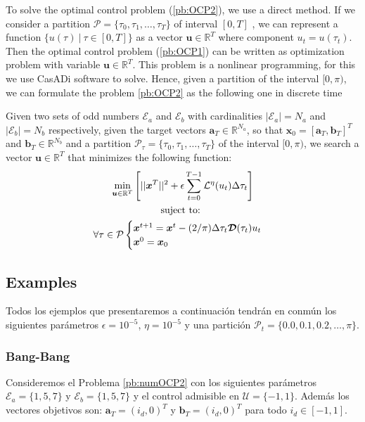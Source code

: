 To solve the optimal control problem (\ref{pb:OCP2}), we use a direct method. 
%
If we consider a partition $\mathcal{P} = \{\tau_0,\tau_1,\dots,\tau_{T}\}$ of interval $[0,T]$ , we can represent a function $\{ u(\tau) \ | \ \tau \in [0,T]\}$ as a vector $\bm{u} \in \mathbb{R}^{T}$ where component $u_t = u(\tau_t)$. 
%
Then the optimal control problem (\ref{pb:OCP1}) can be written as optimization problem with variable $\bm{u} \in \mathbb{R}^{T}$. This problem is a nonlinear programming, for this we use CasADi software to solve. 
%
Hence, given a partition of the interval $[0,\pi)$, we can formulate the problem \ref{pb:OCP2} as the following one in discrete time
\newline

\begin{problem}\label{pb:numOCP2}
Given two sets of odd numbers $\mathcal{E}_a$ and $\mathcal{E}_b$ with cardinalities $|\mathcal{E}_a| = N_a$ and $|\mathcal{E}_b| = N_b$ respectively, given the target vectors $\bm{a}_T  \in \mathbb{R}^{N_a}$, so that $\bm{x}_0 = [\bm{a}_T,\bm{b}_T]^T$ and $\bm{b}_T \in \mathbb{R}^{N_b}$ and a partition $\mathcal{P}_\tau = \{\tau_0,\tau_1,\dots,\tau_{T}\}$ of the interval $[0,\pi)$, we search a vector $\bm{u} \in \mathbb{R}^{T}$ that minimizes the following function:
\begin{gather}
        \min_{\bm{u} \in \mathbb{R}^{T} } 
        \Bigg[ 
        || \bm{x}^{T}||^2
        + \epsilon  \sum_{t=0}^{T-1} \mathcal{L}^\eta(u_{t}) \Delta\tau_t  \Bigg]  \\
        \notag \text{suject to: } \\
        \forall \tau \in \mathcal{P} \begin{cases}
            \bm{x}^{t+1} = \bm{x}^{t} - (2/\pi)\Delta \tau_t \bm{\mathcal{D}}(\tau_t)u_t \\
            \bm{x}^0 = \bm{x}_0
        \end{cases} 
\end{gather}
\end{problem}

\subsection{Examples}

Todos los ejemplos que presentaremos a continuación tendrán en conmún los siguientes parámetros $\epsilon = 10^{-5}$, $\eta = 10^{-5}$ y una partición $\mathcal{P}_t = \{0.0 , 0.1, 0.2 ,\dots,\pi\}$.

\subsubsection{Bang-Bang}
Consideremos el Problema \ref{pb:numOCP2} con los siguientes parámetros $\mathcal{E}_a = \{1,5,7\}$ y  $\mathcal{E}_b = \{1,5,7\}$ y el control admisible en $\mathcal{U} = \{-1,1\}$. Además los vectores objetivos son: $\bm{a}_T = (i_d,0)^T$ y $\bm{b}_T = (i_d,0)^T$ para todo $i_d \in [-1,1]$. 

